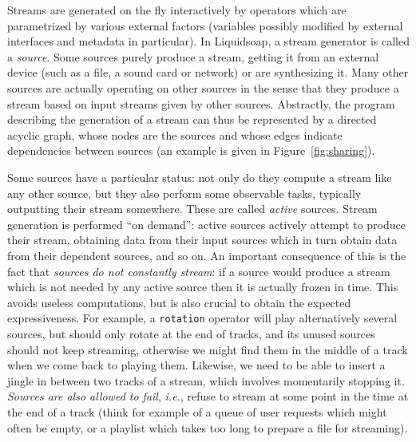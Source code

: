 \documentclass{llncs}
\newcommand{\liquidsoap}{Liquidsoap}
\newcommand{\ie}{\emph{i.e.},}
\begin{document}
Streams are generated on the fly interactively by operators which are parametrized by various 
external factors (variables possibly modified by external interfaces and metadata in particular).
In \liquidsoap{}, a stream generator is called a \emph{source}. Some sources
purely produce a stream, getting it from an external device (such as a file, a
sound card or network) or are synthesizing it. Many other sources are actually
operating on other sources in the sense that they produce a stream based on input
streams given by other sources. Abstractly, the program describing the
generation of a stream can thus be represented by a directed acyclic graph,
whose nodes are the sources and whose edges indicate dependencies between
sources (an example is given in Figure~\ref{fig:sharing}).


Some sources have a particular status: not only do they compute a stream like any
other source, but they also perform some observable tasks, typically outputting
their stream somewhere. These are called \emph{active} sources. Stream
generation is performed ``on demand'': active sources actively attempt to
produce their stream, obtaining data from their input sources which in turn
obtain data from their dependent sources, and so on. An important consequence of
this is the fact that \emph{sources do not constantly stream}: if a source would
produce a stream which is not needed by any active source then it is actually
frozen in time.
This avoids useless computations, but is also crucial to obtain
the expected expressiveness. For example, a \texttt{rotation} operator will play
alternatively several sources, but should only rotate at the end of tracks, and
its unused sources should not keep streaming, otherwise we might find them in
the middle of a track when we come back to playing them. Likewise, we need to be
able to insert a jingle in between two tracks of a stream, which involves
momentarily stopping it. \emph{Sources are also allowed to fail},
\ie{} refuse to stream at some point in the time at the end of a track (think
for example of a queue of user requests which might often be empty,
or a playlist which takes too long to prepare a file for streaming).
\end{document}
